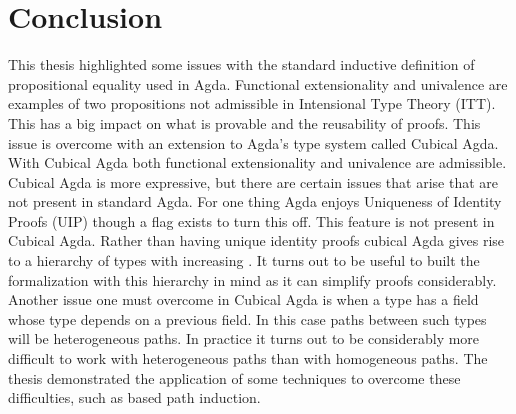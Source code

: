 \chapter{Conclusion}
This thesis highlighted some issues with the standard inductive
definition of propositional equality used in Agda.  Functional
extensionality and univalence are examples of two propositions not
admissible in Intensional Type Theory (ITT).  This has a big impact on
what is provable and the reusability of proofs.  This issue is
overcome with an extension to Agda's type system called Cubical Agda.
With Cubical Agda both functional extensionality and univalence are
admissible.  Cubical Agda is more expressive, but there are certain
issues that arise that are not present in standard Agda.  For one
thing Agda enjoys Uniqueness of Identity Proofs (UIP) though a flag
exists to turn this off.  This feature is not present in Cubical Agda.
Rather than having unique identity proofs cubical Agda gives rise to a
hierarchy of types with increasing .  It turns out to be useful to built the
formalization with this hierarchy in mind as it can simplify proofs
considerably.  Another issue one must overcome in Cubical Agda is when
a type has a field whose type depends on a previous field.  In this
case paths between such types will be heterogeneous paths.  In
practice it turns out to be considerably more difficult to work with
heterogeneous paths than with homogeneous paths.  The thesis
demonstrated the application of some techniques to overcome these
difficulties, such as based path induction.

